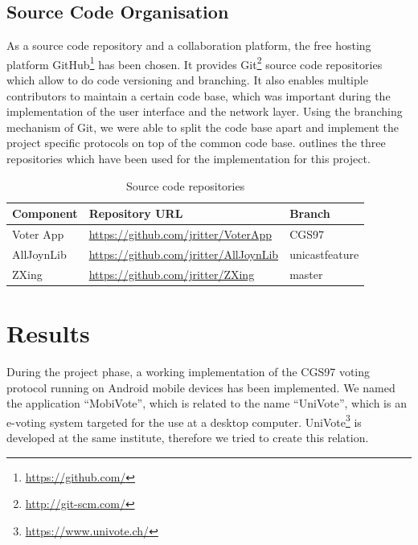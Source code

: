 \documentclass[numbers=noenddot, abstract=on, a4paper, headsepline,
footsepline, oneside, openright, draft=off, listof=leveldown]{scrreprt}
\begin{document}
\section{Source Code Organisation}
As a source code repository and a collaboration platform, the free hosting
platform GitHub\footnote{\url{https://github.com/}} has been chosen. It
provides Git\footnote{\url{http://git-scm.com/}} source code repositories which
allow to do code versioning and branching. It also enables multiple contributors to maintain a certain code base,
which was important during the implementation of the user interface and the
network layer. Using the branching mechanism of Git, we were able to split the
code base apart and implement the project specific protocols on top of the
common code base.  outlines the three
repositories which have been used for the implementation for this project.

\begin{table}[htbp]
	\centering
	\renewcommand{\arraystretch}{1.4}
	\begin{minipage}{\linewidth}
	\begin{tabularx}{\textwidth}{lll}
		\toprule
		\textbf{Component}	&  \textbf{Repository URL} & \textbf{Branch} 	\\
		\midrule
		Voter App			& \url{https://github.com/jritter/VoterApp}	& CGS97	\\
		AllJoynLib		  	& \url{https://github.com/jritter/AllJoynLib}	& unicastfeature	
		\\
		ZXing				& \url{https://github.com/jritter/ZXing}		& master	\\
		\bottomrule
	\end{tabularx}
	\end{minipage}
	\renewcommand{\arraystretch}{1}
	\caption{Source code repositories}
	\label{tab:sourcecoderepositories}
\end{table} 

\chapter{Results}
\label{cha:results}
During the project phase, a working implementation of the CGS97 voting protocol
running on Android mobile devices has been implemented. We named the
application ``MobiVote'', which is related to the name ``UniVote'', which is an
e-voting system targeted for the use at a desktop computer.
UniVote\footnote{\url{https://www.univote.ch/}} is developed at the same
institute, therefore we tried to create this relation.
\end{document}
